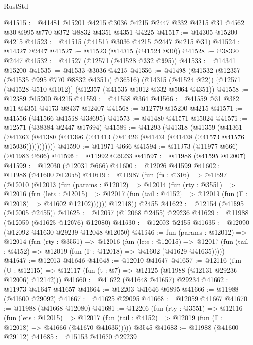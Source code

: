 \begin{lexlean}{RustStd}
\begin{coremodule}
@41515 := @41481
    @15201
    @4215
    @3036
    @4215
    @2447
    @332
    @4215
    @31
    @4562
    @30
    @995
    @770
    @372
    @8832
    @4351
    @4351
    @4225
@41517 := @14305 @15200 @4215
@41523 := @41515 (@41517 @3036 @4215 @2447 @4215 @31)
@41524 := @14327 @2447
@41527 := @41523 (@14315 (@41524 @30))
@41528 := @38320 @2447
@41532 := @41527 (@12571 (@41528 @332 @995))
@41533 := @14341 @15200
@41535 := @41533 @3036 @4215
@41556 := @41498
    (@41532 (@12357 (@41535 @995 @770 @8832 @4351)) @36516)
    (@14315 (@41524 @22))
    (@12571 (@41528 @510 @1012))
    (@12357 (@41535 @1012 @332 @5064 @4351))
@41558 := @12389 @15200 @4215
@41559 := @41558 @364
@41566 := @41559 @31 @382 @11 @4351 @4173 @8437 @12407
@41568 := @12779 @15200 @4215
@41571 := @41556 (@41566 @41568 @38695)
@41573 := @41480 @41571 @15024
@41576 := @12571 (@38384 @2447 @17694)
@41589 := @41293
    (@41318
      (@41359
        (@41361
          (@41363 (@41380 (@41396 (@41413 (@41426 (@41434 (@41438 (@41573 @41576 @15036)))))))))))
@41590 := @11971 @666
@41594 := @11973 (@11977 @666) (@11983 @666)
@41595 := @11992 @29233
@41597 := @11988 (@41595 @12007)
@41599 := @12030 (@12031 @666)
@41600 := @12026 @41599
@41602 := @11988 (@41600 @12055)
@41619 := @11987
    (fun (fn : @316) =>
    @41597
      (@12010
        (@12013
          (fun (params : @12012) =>
          @12014
            (fun (rty : @3551) =>
            @12016
              (fun (lets : @12015) =>
              @12017 (fun (tail : @4152) => @12019 (fun (Γ : @12018) => @41602 @12102))))))
        @12148))
    @2455
@41622 := @12154 (@41595 (@12005 @2455))
@41625 := @12067 (@12068 @2455) @29236
@41629 := @11988 (@12059 (@41625 @12076) @12080)
@41630 := @12093 @2455
@41635 := @12090 (@12092 @41630 @29239 @12048 @12050)
@41646 := fun (params : @12012) =>
  @12014
    (fun (rty : @3551) =>
    @12016
      (fun (lets : @12015) =>
      @12017 (fun (tail : @4152) => @12019 (fun (Γ : @12018) => @41602 (@41629 @41635)))))
@41647 := @12013 @41646
@41648 := @12010 @41647
@41657 := @12116
    (fun (U : @12115) => @12117 (fun (t : @7) => @12125 (@11988 (@12131 @29236 @12006) @12142)))
@41660 := @41622 (@41648 @41657) @29234
@41662 := @11973 @41647 @41657
@41664 := @12203 @41646 @6895
@41666 := @11988 (@41600 @29092)
@41667 := @41625 @29095
@41668 := @12059 @41667
@41670 := @11988 (@41668 @12080)
@41681 := @12206
    (fun (rty : @3551) =>
    @12016
      (fun (lets : @12015) =>
      @12017 (fun (tail : @4152) => @12019 (fun (Γ : @12018) => @41666 (@41670 @41635)))))
    @3545
@41683 := @11988 (@41600 @29112)
@41685 := @15153 @41630 @29239

\end{coremodule}
\end{lexlean}
